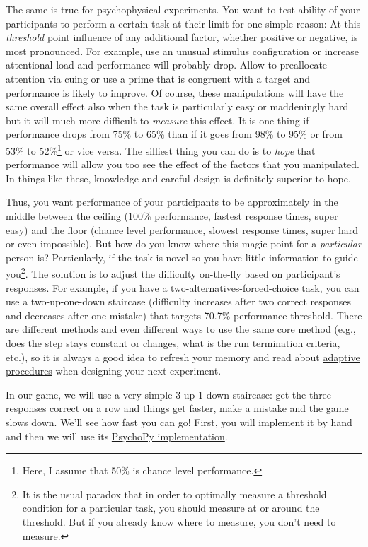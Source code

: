 \documentclass[
]{book}
\begin{document}
The same is true for psychophysical experiments. You want to test ability of your participants to perform a certain task at their limit for one simple reason: At this \emph{threshold} point influence of any additional factor, whether positive or negative, is most pronounced. For example, use an unusual stimulus configuration or increase attentional load and performance will probably drop. Allow to preallocate attention via cuing or use a prime that is congruent with a target and performance is likely to improve. Of course, these manipulations will have the same overall effect also when the task is particularly easy or maddeningly hard but it will much more difficult to \emph{measure} this effect. It is one thing if performance drops from 75\% to 65\% than if it goes from 98\% to 95\% or from 53\% to 52\%\footnote{Here, I assume that 50\% is chance level performance.} or vice versa. The silliest thing you can do is to \emph{hope} that performance will allow you too see the effect of the factors that you manipulated. In things like these, knowledge and careful design is definitely superior to hope.

Thus, you want performance of your participants to be approximately in the middle between the ceiling (100\% performance, fastest response times, super easy) and the floor (chance level performance, slowest response times, super hard or even impossible). But how do you know where this magic point for a \emph{particular} person is? Particularly, if the task is novel so you have little information to guide you\footnote{It is the usual paradox that in order to optimally measure a threshold condition for a particular task, you should measure at or around the threshold. But if you already know where to measure, you don't need to measure.}. The solution is to adjust the difficulty on-the-fly based on participant's responses. For example, if you have a two-alternatives-forced-choice task, you can use a two-up-one-down staircase (difficulty increases after two correct responses and decreases after one mistake) that targets 70.7\% performance threshold. There are different methods and even different ways to use the same core method (e.g., does the step stays constant or changes, what is the run termination criteria, etc.), so it is always a good idea to refresh your memory and read about \href{https://doi.org/10.3758/BF03194543}{adaptive procedures} when designing your next experiment.

In our game, we will use a very simple 3-up-1-down staircase: get the three responses correct on a row and things get faster, make a mistake and the game slows down. We'll see how fast you can go! First, you will implement it by hand and then we will use its \href{https://psychopy.org/api/data.html\#stairhandler}{PsychoPy implementation}.
\end{document}
